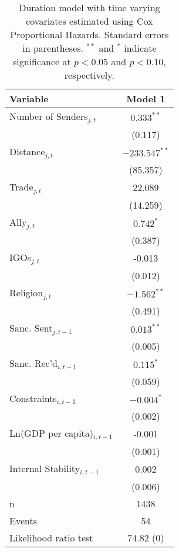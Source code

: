 \begin{table}[ht]
\centering
{\normalsize
\begin{tabular}{lc}
 Variable & Model 1 \\ 
  \hline
\hline
Number of Senders$_{j,t}$ & $0.333^{\ast\ast}$ \\ 
   & (0.117) \\ 
  Distance$_{j,t}$ & $-233.547^{\ast\ast}$ \\ 
   & (85.357) \\ 
  Trade$_{j,t}$ & 22.089 \\ 
   & (14.259) \\ 
  Ally$_{j,t}$ & $0.742^{\ast}$ \\ 
   & (0.387) \\ 
  IGOs$_{j,t}$ & -0.013 \\ 
   & (0.012) \\ 
  Religion$_{j,t}$ & $-1.562^{\ast\ast}$ \\ 
   & (0.491) \\ 
   \hline
Sanc. Sent$_{j,t-1}$ & $0.013^{\ast\ast}$ \\ 
   & (0.005) \\ 
  Sanc. Rec'd$_{i,t-1}$ & $0.115^{\ast}$ \\ 
   & (0.059) \\ 
   \hline
Constraints$_{i,t-1}$ & $-0.004^{\ast}$ \\ 
   & (0.002) \\ 
  Ln(GDP per capita)$_{i,t-1}$ & -0.001 \\ 
   & (0.001) \\ 
  Internal Stability$_{i,t-1}$ & 0.002 \\ 
   & (0.006) \\ 
   \hline
n & 1438 \\ 
  Events & 54 \\ 
  Likelihood ratio test & 74.82 (0) \\ 
   \hline
\hline
\end{tabular}
}
\caption{Duration model with time varying covariates estimated using Cox Proportional Hazards. Standard errors in parentheses. $^{**}$ and $^{*}$ indicate significance at $p< 0.05 $ and $p< 0.10 $, respectively.} 
\label{table1}
\end{table}
